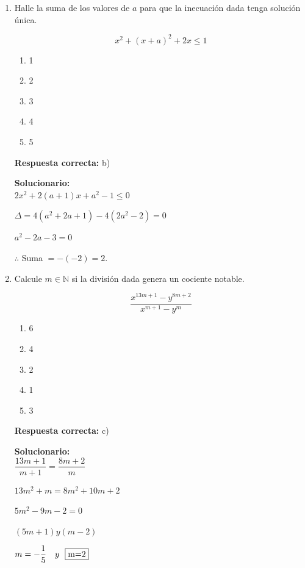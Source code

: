 \begin{enumerate}
	
	\item Halle la suma de los valores de $a$ para que la inecuación dada tenga solución única.
	
	$$x^2+(x+a)^2+2x\leq 1$$
	
	\begin{enumerate}[label=\alph*)]
		\item 1
		\item 2
		\item 3
		\item 4
		\item 5
	\end{enumerate}
	\textbf{Respuesta correcta:} b)
	
	\vspace{2mm}
	\textbf{Solucionario:}\\
	
	$2x^2+2(a+1)x+a^2-1\leq 0$
	
	$\Delta=4(a^2+2a+1)-4(2a^2-2)=0$
	
	$a^2-2a-3=0$
	
	$\therefore$ Suma $=-(-2)=2$.
	
	\vspace{6mm}
	
	\item Calcule $m\in \mathbb{N}$ si la división dada genera un cociente notable.
	
	$$\dfrac{x^{13m+1}-y^{8m+2}}{x^{m+1}-y^m}$$
	
	\begin{enumerate}[label=\alph*)]
		\item 6
		\item 4
		\item 2
		\item 1
		\item 3
	\end{enumerate}
	\textbf{Respuesta correcta:} c)
	
	\vspace{2mm}
	\textbf{Solucionario:}\\
	
	$\dfrac{13m+1}{m+1}=\dfrac{8m+2}{m}$
	
	$13m^2+m=8m^2+10m+2$
	
	$5m^2-9m-2=0$
	
	$(5m+1) y (m-2) $
	
	
	$m=-\dfrac{1}{5}\ \ \ y\ \ \fbox{m=2}$
	
	\vspace{6mm}
	

\end{enumerate}
